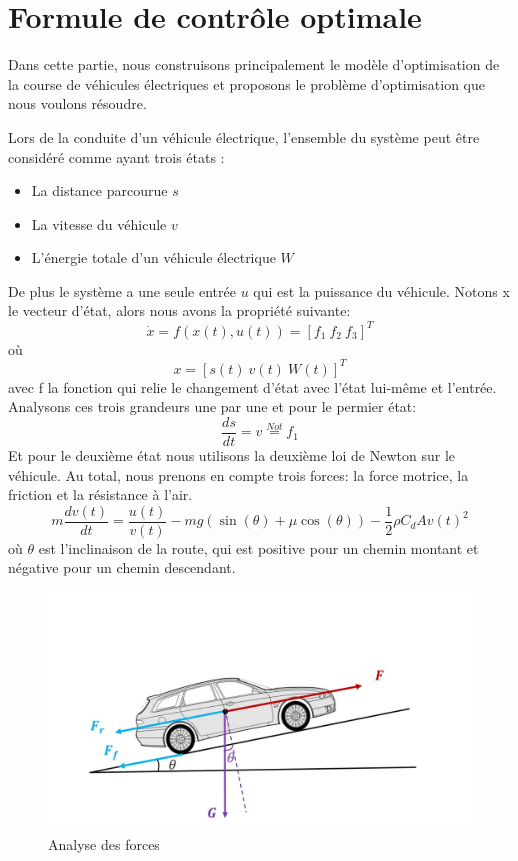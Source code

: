 \documentclass[lettersize,journal]{IEEEtran}
\begin{document}
\section{Formule de contrôle optimale}
Dans cette partie, nous construisons principalement le modèle d’optimisation de la course de véhicules électriques et proposons le problème d’optimisation que nous voulons résoudre.\par
Lors de la conduite d’un véhicule électrique, l’ensemble du système peut être considéré comme ayant trois états :
\begin{itemize}
    \item La distance parcourue $s$
    \item La vitesse du véhicule $v$
    \item L’énergie totale d’un véhicule électrique $W$
\end{itemize}\par
De plus le système a une seule entrée $u$ qui est la puissance du véhicule. Notons x le vecteur d'état, alors nous avons la propriété suivante:
\begin{equation}
    \dot{x} = f(x(t), u(t)) = [f_1\ f_2\ f_3]^{T}
\end{equation}
où
\begin{equation}
    x = [s(t)\ v(t)\ W(t)]^{T}
\end{equation}
avec f la fonction qui relie le changement d'état avec l'état lui-même et l'entrée. Analysons ces trois grandeurs une par une et pour le permier état:
\begin{equation}
    \frac{ds}{dt} = v \overset{Not}{=} f_1
\end{equation}
Et pour le deuxième état nous utilisons la deuxième loi de Newton sur le véhicule. Au total, nous prenons en compte trois forces: la force motrice, la friction et la résistance à l'air.
\begin{equation}
    m\frac{dv(t)}{dt} = \frac{u(t)}{v(t)} - mg(\sin (\theta)+ \mu \cos (\theta))-\frac{1}{2}\rho C_{d}A v(t)^{2}
\end{equation}
où $\theta$ est l'inclinaison de la route, qui est positive pour un chemin montant et négative pour un chemin descendant.
\begin{figure}[H]
    \centering
    \includegraphics[width=1\linewidth]{force.jpg}
    \caption{Analyse des forces}
    \label{fig:enter-label}
\end{figure}
\end{document}
